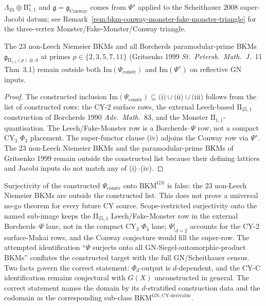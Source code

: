 \begin{corollary}
\begin{enumerate}[label=\textup{(\roman*$'$)}, resume]
$\Lambda_{24}\oplus\mathrm{II}_{1,1}^{s}$ and $\mathfrak{g} =
\mathfrak{g}_{\mathrm{Conway}}$ comes from $\Psi^{s}$ applied to
the Scheithauer 2008 super-Jacobi datum; see
Remark~\ref{rem:bkm-conway-monster-fake-monster-triangle} for the
three-vertex Monster/Fake-Monster/Conway triangle.
\end{enumerate}
The 23 non-Leech Niemeier BKMs and all Borcherds paramodular-prime
BKMs $\mathfrak{g}_{\mathrm{II}_{1,1}(p) \oplus \Lambda}$ at primes
$p \in \{2, 3, 5, 7, 11\}$ (Gritsenko 1999
\emph{St.\ Petersb.\ Math.\ J.}~11 Thm~3.1) remain outside both
$\mathrm{Im}(\Psi_{\mathrm{constr}})$ and $\mathrm{Im}(\Psi^{s})$ on
reflective GN inputs.
\end{corollary}

\begin{proof}
The constructed inclusion $\mathrm{Im}(\Psi_{\mathrm{constr}}) \subseteq \text{(i)}\cup\text{(ii)}\cup\text{(iii)}$ follows from the list of constructed rows: the CY-2 surface rows, the external Leech-based $\mathrm{II}_{25,1}$ construction of Borcherds 1990 \emph{Adv.\ Math.}~83, and the Monster $\mathrm{II}_{1,1}$-quantisation. The Leech/Fake-Monster row is a Borcherds--$\Psi$ row, not a compact CY$_3$ $\Phi_3$ placement. The super-functor clause (iv) adjoins the Conway row via $\Psi^{s}$. The 23 non-Leech Niemeier BKMs and the paramodular-prime BKMs of Gritsenko 1999 remain outside the constructed list because their defining lattices and Jacobi inputs do not match any of (i)--(iv).
\end{proof}

\begin{remark}
\label{rem:psi-scope-restriction-discipline}
Surjectivity of the constructed $\Psi_{\mathrm{constr}}$ onto $\mathrm{BKM}^{\mathrm{GN}}$ is false: the 23 non-Leech Niemeier BKMs are outside the constructed list. This does not prove a universal no-go theorem for every future CY source. Scope-restricted surjectivity onto the named sub-image keeps the II$_{25,1}$ Leech/Fake-Monster row in the external Borcherds--$\Psi$ lane, not in the compact CY$_3$ $\Phi_3$ lane; $\Psi|_{d=2}$ accounts for the CY-2 surface-Mukai rows, and the Conway conjecture would fill the super-row. The attempted identification ``$\Psi$ surjects onto all GN-Siegel-automorphic-product BKMs'' conflates the constructed target with the full GN/Scheithauer census. Two facts govern the correct statement: $\Phi_d$-output is $d$-dependent, and the CY-C identification remains conjectural with $G(X)$ unconstructed in general. The correct statement names the domain by its \(d\)-stratified construction data and the codomain as the corresponding sub-class \(\mathrm{BKM}^{\mathrm{GN, CY\text{-}derivable}}\).
\end{remark}


